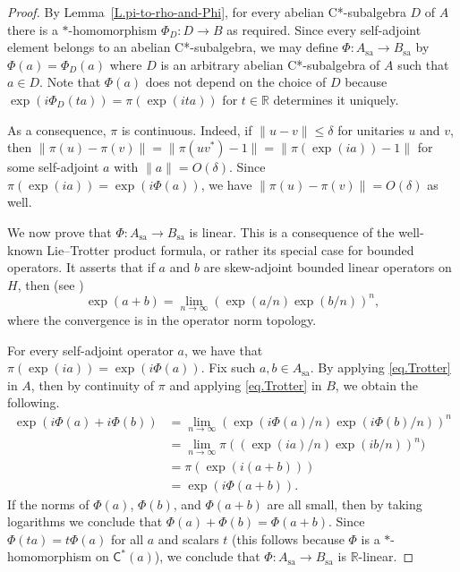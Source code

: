 \documentclass[11pt]{amsproc}
\newcommand{\cstar}{C*}
\newcommand{\cst}{\mathsf{C^*}}
\theoremstyle{definition}
\theoremstyle{plain}
\theoremstyle{remark}
\begin{document}
\begin{proof} By 
	Lemma~\ref{L.pi-to-rho-and-Phi},   for every abelian \cstar-subalgebra $D$ of $A$ there is  a $*$-homomorphism $\Phi_D\colon D\to B$  as required.  Since every  self-adjoint element  belongs to an abelian \cstar-subalgebra, we may define $\Phi \colon A_\textrm{sa}\to B_{\textrm{sa}}$ by $\Phi(a)=\Phi_D(a)$ where $D$ is an arbitrary abelian \cstar-subalgebra of $A$ such that $a\in D$. Note that $\Phi(a)$ does not depend on the choice of $D$ because $\exp(i\Phi_D(ta))=\pi(\exp(ita))$ for $t \in \mathbb R$ determines it uniquely. 

	As a consequence, $\pi$ is continuous. Indeed, if $\|u-v\|\leq \delta$ for unitaries $u$ and $v$, then $\|\pi(u)-\pi(v)\|=\|\pi(uv^*)-1\|=\|\pi(\exp(i a)) -1\|$ for some self-adjoint $a$ with $\|a\|=O(\delta)$. Since $\pi(\exp(i a))=\exp(i \Phi(a))$, we have $\|\pi(u)-\pi(v)\|=O(\delta)$ as well.

	We now prove that $\Phi \colon A_{\textrm{sa}} \to B_{\textrm{sa}}$ is linear. This is a consequence of the well-known Lie--Trotter product formula, or rather its special case for bounded operators.  It asserts that if $a$ and $b$ are skew-adjoint bounded linear operators on $H$, then  (see \cite[Exercise 15, p. 67]{Trotter})
	\begin{equation}
		\label{eq.Trotter}
		\exp(a+b)=\lim_{n\to \infty} (\exp(a/n)\exp(b/n))^n, 
	\end{equation}
	where the convergence is in the operator norm topology.
	
	
	For every self-adjoint operator $a$, we have that 
	$
	\pi(\exp(ia))=\exp(i\Phi(a)). 
	$
 	Fix such $a, b \in A_{\textrm{sa}}$. 
	By applying \eqref{eq.Trotter} in $A$, then 
	by continuity  of $\pi$ and applying \eqref{eq.Trotter} in $B$, we obtain the following. 
	\begin{align*}
		\exp(i\Phi(a)+i\Phi(b))&=\lim_{n\to \infty} (\exp(i\Phi(a)/n)\exp(i\Phi(b)/n))^n\\
		&=\lim_{n\to \infty} \pi((\exp(ia)/n)\exp(ib/n))^n)\\
		&=\pi(\exp(i(a+b)))\\
		&=\exp(i\Phi(a+b)). 
	\end{align*}
	If the norms of $\Phi(a)$, $\Phi(b)$, and $\Phi(a+b)$ are all small, then by taking logarithms we conclude that $\Phi(a)+\Phi(b)=\Phi(a+b)$. Since $\Phi(ta)=t\Phi(a)$ for all $a$ and scalars $t$ (this follows because $\Phi$ is a $*$-homomorphism on $\cst(a)$), we conclude that $\Phi \colon A_{\textrm{sa}} \to B_{\textrm{sa}}$ is $\mathbb R$-linear.


\end{proof}
\end{document}
